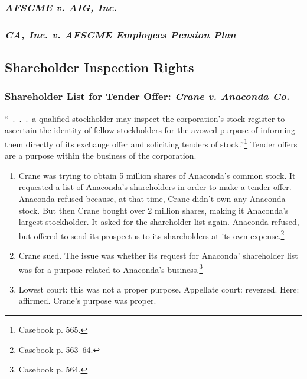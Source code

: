 
\subsubsection{\emph{AFSCME v. AIG, Inc.}}


\subsubsection{\emph{CA, Inc. v. AFSCME Employees Pension Plan}}


\subsection{Shareholder Inspection Rights}


\subsubsection{Shareholder List for Tender Offer: \emph{Crane v. Anaconda Co.}}

``~.~.~.~a qualified stockholder may inspect the corporation's stock register to 
ascertain the identity of fellow stockholders for the avowed purpose of 
informing them directly of its exchange offer and soliciting tenders of 
stock.''\footnote{Casebook p. 565.} Tender offers are a purpose within the 
business of the corporation.

\begin{enumerate}
    \item Crane was trying to obtain 5 million shares of Anaconda's common 
    stock. It requested a list of Anaconda's shareholders in order to make a 
    tender offer. Anaconda refused because, at that time, Crane didn't own any 
    Anaconda stock. But then Crane bought over 2 million shares, making it 
    Anaconda's largest stockholder. It asked for the shareholder list again. 
    Anaconda refused, but offered to send its prospectus to its shareholders at 
    its own expense.\footnote{Casebook p.  563--64.}
    \item Crane sued. The issue was whether its request for Anaconda' 
    shareholder list was for a purpose related to Anaconda's 
    business.\footnote{Casebook p. 564.}
    \item Lowest court: this was not a proper purpose. Appellate court: 
    reversed. Here: affirmed. Crane's purpose was proper.
\end{enumerate}

